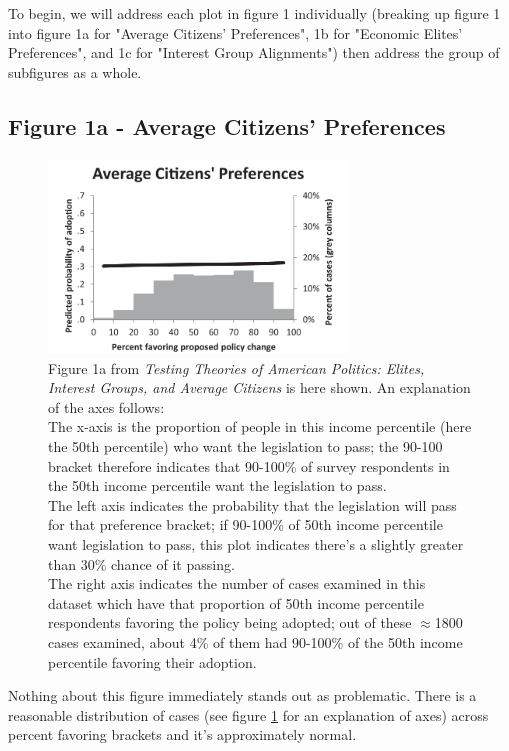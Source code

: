 \documentclass[]{article}
\begin{document}
To begin, we will address each plot in figure 1 individually (breaking up figure 1 into figure 1a for "Average Citizens' Preferences", 1b for "Economic Elites' Preferences", and 1c for "Interest Group Alignments") then address the group of subfigures as a whole.

\subsection{Figure 1a - Average Citizens' Preferences}
\begin{figure}[H]
	\begin{center}
		\includegraphics[width=300px]{./figures/paper/average-citizens-preferences.png}
	\end{center}	
	\caption{Figure 1a from \textit{Testing Theories of American Politics: Elites, Interest Groups, and Average Citizens} is here shown. An explanation of the axes follows: \\The x-axis is the proportion of people in this income percentile (here the 50th percentile) who want the legislation to pass; the 90-100 bracket therefore indicates that 90-100\% of survey respondents in the 50th income percentile want the legislation to pass. \\The left axis indicates the probability that the legislation will pass for that preference bracket; if 90-100\% of 50th income percentile want legislation to pass, this plot indicates there's a slightly greater than 30\% chance of it passing. \\The right axis indicates the number of cases examined in this dataset which have that proportion of 50th income percentile respondents favoring the policy being adopted; out of these $\approx$1800 cases examined, about 4\% of them had 90-100\% of the 50th income percentile favoring their adoption.}
	\label{paper_figure1a}
\end{figure}

Nothing about this figure immediately stands out as problematic. There is a reasonable distribution of cases (see figure \ref{paper_figure1a} for an explanation of axes) across percent favoring brackets and it's approximately normal.
\end{document}
